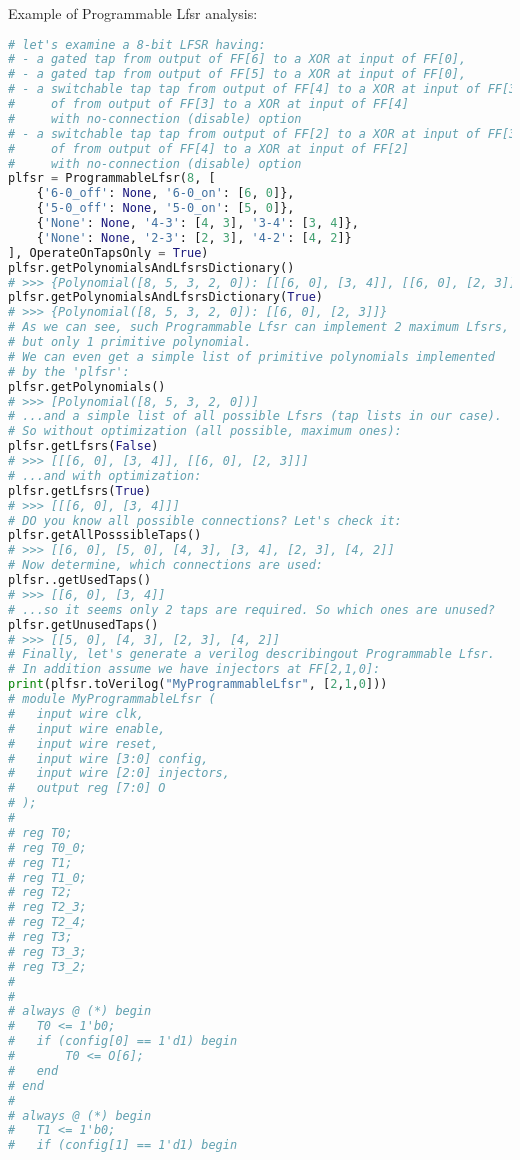 \label{programmablelfsrexample}
Example of Programmable Lfsr analysis:
\begin{lstlisting}[language=Python]
# let's examine a 8-bit LFSR having:
# - a gated tap from output of FF[6] to a XOR at input of FF[0], 
# - a gated tap from output of FF[5] to a XOR at input of FF[0], 
# - a switchable tap tap from output of FF[4] to a XOR at input of FF[3]
#     of from output of FF[3] to a XOR at input of FF[4]
#     with no-connection (disable) option
# - a switchable tap tap from output of FF[2] to a XOR at input of FF[3]
#     of from output of FF[4] to a XOR at input of FF[2]
#     with no-connection (disable) option
plfsr = ProgrammableLfsr(8, [
	{'6-0_off': None, '6-0_on': [6, 0]},
	{'5-0_off': None, '5-0_on': [5, 0]},
	{'None': None, '4-3': [4, 3], '3-4': [3, 4]},
	{'None': None, '2-3': [2, 3], '4-2': [4, 2]}
], OperateOnTapsOnly = True)
plfsr.getPolynomialsAndLfsrsDictionary()
# >>> {Polynomial([8, 5, 3, 2, 0]): [[[6, 0], [3, 4]], [[6, 0], [2, 3]]]}
plfsr.getPolynomialsAndLfsrsDictionary(True)
# >>> {Polynomial([8, 5, 3, 2, 0]): [[6, 0], [2, 3]]}
# As we can see, such Programmable Lfsr can implement 2 maximum Lfsrs,
# but only 1 primitive polynomial.
# We can even get a simple list of primitive polynomials implemented
# by the 'plfsr':
plfsr.getPolynomials()
# >>> [Polynomial([8, 5, 3, 2, 0])]
# ...and a simple list of all possible Lfsrs (tap lists in our case).
# So without optimization (all possible, maximum ones):
plfsr.getLfsrs(False)
# >>> [[[6, 0], [3, 4]], [[6, 0], [2, 3]]]
# ...and with optimization:
plfsr.getLfsrs(True)
# >>> [[[6, 0], [3, 4]]]
# DO you know all possible connections? Let's check it:
plfsr.getAllPosssibleTaps()
# >>> [[6, 0], [5, 0], [4, 3], [3, 4], [2, 3], [4, 2]]
# Now determine, which connections are used:
plfsr..getUsedTaps()
# >>> [[6, 0], [3, 4]]
# ...so it seems only 2 taps are required. So which ones are unused?
plfsr.getUnusedTaps()
# >>> [[5, 0], [4, 3], [2, 3], [4, 2]]
# Finally, let's generate a verilog describingout Programmable Lfsr.
# In addition assume we have injectors at FF[2,1,0]:
print(plfsr.toVerilog("MyProgrammableLfsr", [2,1,0]))
# module MyProgrammableLfsr (
# 	input wire clk,
# 	input wire enable,
# 	input wire reset,
# 	input wire [3:0] config,
# 	input wire [2:0] injectors,
# 	output reg [7:0] O
# );
# 
# reg T0;
# reg T0_0;
# reg T1;
# reg T1_0;
# reg T2;
# reg T2_3;
# reg T2_4;
# reg T3;
# reg T3_3;
# reg T3_2;
# 
# 
# always @ (*) begin
# 	T0 <= 1'b0;
# 	if (config[0] == 1'd1) begin
# 		T0 <= O[6];
# 	end
# end
# 
# always @ (*) begin
# 	T1 <= 1'b0;
# 	if (config[1] == 1'd1) begin

\end{lstlisting}
